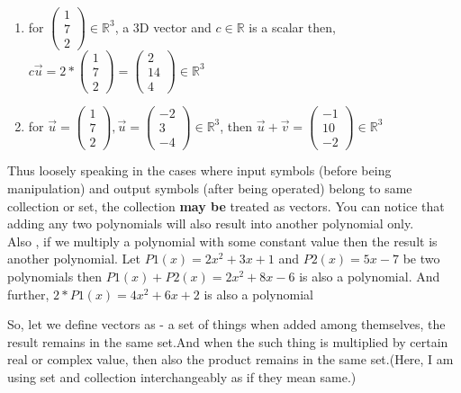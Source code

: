 \documentclass{article}
\begin{document}
\begin{enumerate}
    \item for $\begin{pmatrix}1\\7\\2\end{pmatrix}\in \mathbb{R}^3$, a 3D vector and $c\in\mathbb{R}$ is a scalar then, \\$c\overrightarrow{u}=2*\begin{pmatrix}1\\7\\2\end{pmatrix}= \begin{pmatrix}2\\14\\4\end{pmatrix}\in \mathbb{R}^3$
   
    \item for $\overrightarrow{u}= \begin{pmatrix} 1\\7\\2 \end{pmatrix}, \overrightarrow{u}= \begin{pmatrix} -2\\3\\-4 \end{pmatrix}\in \mathbb{R}^3$, then $\overrightarrow{u}+\overrightarrow{v}= \begin{pmatrix}-1\\10\\-2 \end{pmatrix}\in \mathbb{R}^3 $\\
\end{enumerate} 
 Thus loosely speaking in the cases where input symbols (before being manipulation) and output symbols (after being operated) belong to same collection or set, the collection \textbf{may be} treated as vectors. You can  notice that adding any two polynomials will also result into another polynomial only. \\
 Also , if we multiply a polynomial with some constant value then the result is another polynomial. Let $P1(x)= 2x^2+3x+1$ and $P2(x)=5x-7$ be two polynomials then $P1(x)+P2(x)=2x^2+8x-6$ is also a polynomial. And further, $2*P1(x)=4x^2+6x+2$ is also a polynomial
 
 So, let we define vectors as - a set of things when added among themselves, the result remains in the same set.And when the such thing is multiplied by certain real or complex value, then also the product remains in the same set.(Here, I am using set and collection interchangeably as if they mean same.)\\
  
\end{document}
